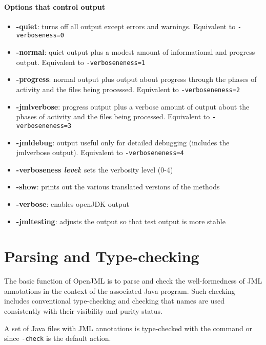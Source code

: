 \paragraph{Options that control output}
\begin{itemize}[noitemsep,nolistsep]
\item \textbf{-quiet}: turns off all output except errors and warnings. Equivalent to \texttt{-verboseness=0}
\item \textbf{-normal}: quiet output plus a modest amount of informational and progress output. Equivalent to \texttt{-verboseneness=1}
\item \textbf{-progress}: normal output plus output about progress through the phases of activity and the files being processed. Equivalent to \texttt{-verboseneness=2}
\item \textbf{-jmlverbose}: progress output plus a verbose amount of output about the phases of activity and the files being processed. Equivalent to \texttt{-verboseneness=3}
\item \textbf{-jmldebug}: output useful only for detailed debugging (includes the jmlverbose output). Equivalent to \texttt{-verboseneness=4}
\item \textbf{-verboseness \textit{level}}: sets the verbosity level (0-4)
\item \textbf{-show}: prints out the various translated versions of the methods
\item \textbf{-verbose}: enables openJDK output
\item \textbf{-jmltesting}: adjusts the output so that test output is more stable
\end{itemize}


\section{Parsing and Type-checking}

The basic function of OpenJML is to parse and check the well-formedness of JML annotations in the context of the associated Java program.
Such checking includes conventional type-checking and checking that names are used consistently with their visibility and purity status. 

A set of Java files with JML annotations is type-checked with the command
or
since \texttt{-check} is the default action.

